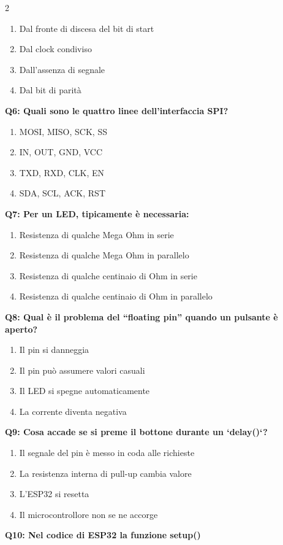\documentclass[10pt]{article}
\begin{document}
\begin{multicols}{2}
\begin{enumerate}[label=\arabic*.]
\item Dal fronte di discesa del bit di start
\item Dal clock condiviso
\item Dall’assenza di segnale
\item Dal bit di parità
\end{enumerate}
\textbf{Q6: Quali sono le quattro linee dell’interfaccia SPI?}

\begin{enumerate}[label=\arabic*.]
\item MOSI, MISO, SCK, SS
\item IN, OUT, GND, VCC
\item TXD, RXD, CLK, EN
\item SDA, SCL, ACK, RST
\end{enumerate}
\textbf{Q7: Per un LED, tipicamente è necessaria:}

\begin{enumerate}[label=\arabic*.]
\item Resistenza di qualche Mega Ohm in serie
\item Resistenza di qualche Mega Ohm in parallelo
\item Resistenza di qualche centinaio di Ohm in serie
\item Resistenza di qualche centinaio di Ohm in parallelo
\end{enumerate}
\textbf{Q8: Qual è il problema del “floating pin” quando un pulsante è aperto?}

\begin{enumerate}[label=\arabic*.]
\item Il pin si danneggia
\item Il pin può assumere valori casuali
\item Il LED si spegne automaticamente
\item La corrente diventa negativa
\end{enumerate}
\textbf{Q9: Cosa accade se si preme il bottone durante un `delay()`?}

\begin{enumerate}[label=\arabic*.]
\item Il segnale del pin è messo in coda alle richieste
\item La resistenza interna di pull-up cambia valore
\item L’ESP32 si resetta
\item Il microcontrollore non se ne accorge
\end{enumerate}
\textbf{Q10: Nel codice di ESP32 la funzione setup()}


\end{multicols}
\end{document}
